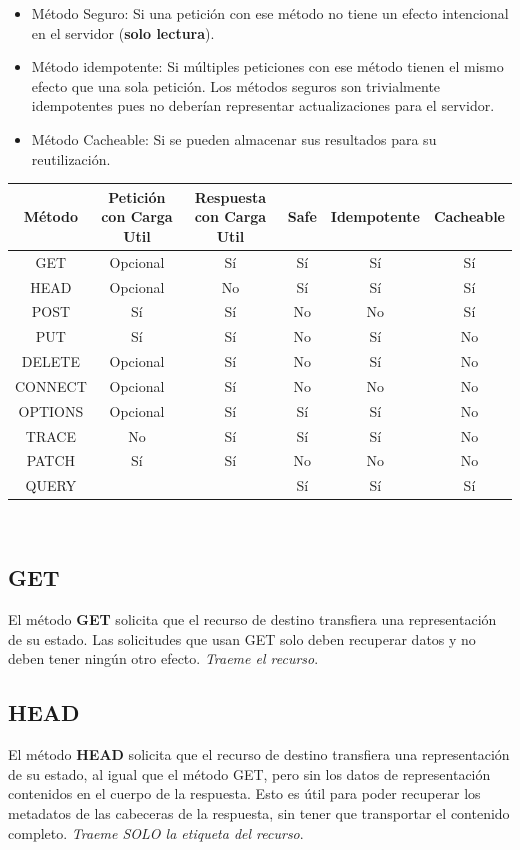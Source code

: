 \documentclass[a4paper,10pt]{article}
\begin{document}
\begin{itemize}

    \item Método Seguro:  Si una petición con ese método no tiene un efecto intencional en el servidor (\textbf{solo lectura}).
    
    \item Método idempotente: Si múltiples peticiones con ese método tienen el mismo efecto que una sola petición.
    Los métodos seguros son trivialmente idempotentes pues no deberían representar actualizaciones para el servidor.
    
    \item Método Cacheable: Si se pueden almacenar sus resultados para su reutilización.

\end{itemize}

\begin{tabular}{| c | c | c | c | c | c |}
    \hline
    Método & Petición con Carga Util & Respuesta con Carga Util & Safe & Idempotente & Cacheable \\
    \hline
    GET & Opcional	& Sí & Sí & Sí & Sí \\ 
    \hline
    HEAD & Opcional	& No & Sí&	Sí&	Sí\\
    \hline
    POST & Sí &Sí &No	&No	&Sí\\
    \hline
    PUT & Sí &Sí &No	&Sí	&No\\
    \hline
    DELETE &Opcional	&Sí	&No	&Sí	&No\\
    \hline
    CONNECT &Opcional	&Sí &No	&No	&No \\
    \hline
    OPTIONS& Opcional&	Sí&	Sí&	Sí	&No \\
    \hline
    TRACE &  No	&Sí	&Sí	&Sí	&No \\
    \hline
    PATCH & Sí	&Sí	&No	&No	&No\\
    \hline
    QUERY & & &Sí & Sí & Sí\\
    \hline
\end{tabular}

\

\subsection{GET}
El método \textbf{GET} solicita que el recurso de destino transfiera una representación de su estado. 
Las solicitudes que usan GET solo deben recuperar datos y no deben tener ningún otro efecto. \textit{Traeme el recurso}.

\subsection{HEAD}
El método \textbf{HEAD} solicita que el recurso de destino transfiera una representación de su estado, al igual que el método GET, pero sin los datos de representación contenidos en el cuerpo de la respuesta.
Esto es útil para poder recuperar los metadatos de las cabeceras de la respuesta, sin tener que transportar el contenido completo.
\textit{Traeme SOLO la etiqueta del recurso}.
\end{document}
